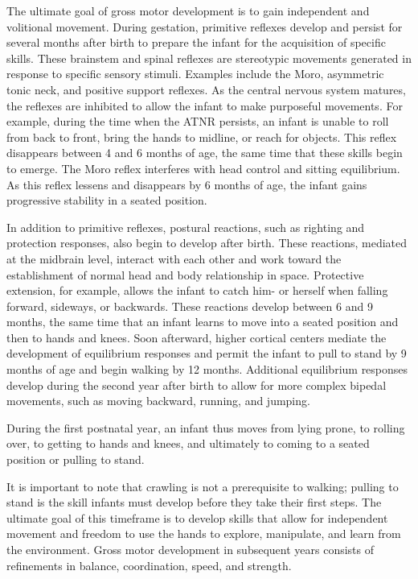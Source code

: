 The ultimate goal of gross motor development is to gain independent and
volitional movement. During gestation, primitive reflexes develop and persist
for several months after birth to prepare the infant for the acquisition of
specific skills. These brainstem and spinal reflexes are stereotypic movements
generated in response to specific sensory stimuli. Examples include the Moro,
asymmetric tonic neck, and positive support reflexes. As the central nervous
system matures, the reflexes are inhibited to allow the infant to make
purposeful movements. For example, during the time when the ATNR persists, an
infant is unable to roll from back to front, bring the hands to midline, or
reach for objects. This reflex disappears between 4 and 6 months of age, the
same time that these skills begin to emerge. The Moro reflex interferes with
head control and sitting equilibrium. As this reflex lessens and disappears by
6 months of age, the infant gains progressive stability in a seated position.
\cite{Gerber2010}

In addition to primitive reflexes, postural reactions, such as righting and
protection responses, also begin to develop after birth. These reactions,
mediated at the midbrain level, interact with each other and work toward the
establishment of normal head and body relationship in space. Protective
extension, for example, allows the infant to catch him- or herself when falling
forward, sideways, or backwards. These reactions develop between 6 and 9
months, the same time that an infant learns to move into a seated position and
then to hands and knees. Soon afterward, higher cortical centers mediate the
development of equilibrium responses and permit the infant to pull to stand by
9 months of age and begin walking by 12 months. Additional equilibrium
responses develop during the second year after birth to allow for more complex
bipedal movements, such as moving backward, running, and jumping.
\cite{Gerber2010}

During the first postnatal year, an infant thus moves from lying prone, to
rolling over, to getting to hands and knees, and ultimately to coming to a
seated position or pulling to stand. \cite{Gerber2010}

It is important to note that crawling is not a prerequisite to walking;
pulling to stand is the skill infants must develop before they take their first
steps. The ultimate goal of this timeframe is to develop skills that allow for
independent movement and freedom to use the hands to explore, manipulate, and
learn from the environment. Gross motor development in subsequent years
consists of refinements in balance, coordination, speed, and strength.
\cite{Gerber2010}


